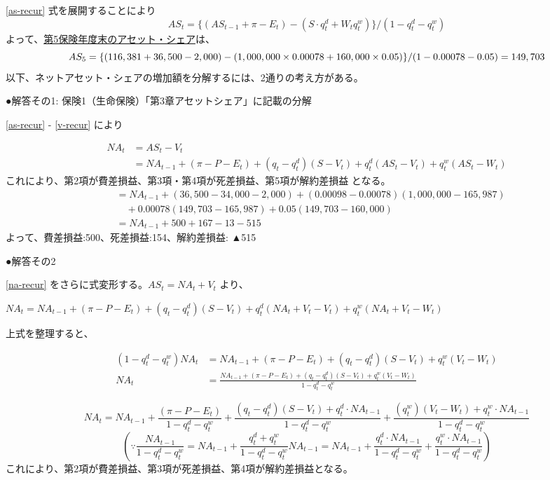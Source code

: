 \documentclass[report,gutter=10mm,fore-edge=10mm,uplatex,dvipdfmx]{jlreq}
\begin{document}
\eqref{as-recur} 式を展開することにより
$$
 AS_t=\{(AS_{t-1}+\pi-E_t)-(S\cdot q^d_t+W_tq^w_t)\}/(1-q^d_t-q^w_t)
$$
よって、\underline{第5保険年度末のアセット・シェア}は、
$$
 AS_5=\{(116,381+36,500-2,000)-(1,000,000\times 0.00078+160,000\times 0.05)\}/(1-0.00078-0.05)\\
=149,703
$$
以下、ネットアセット・シェアの増加額を分解するには、2通りの考え方がある。

●解答その1: 保険1（生命保険）「第3章アセットシェア」に記載の分解

\eqref{as-recur} - \eqref{v-recur} により

\begin{equation}
\begin{split}
NA_t&=AS_t-V_t \\
&= NA_{t-1}+(\pi-P-E_t)+(q_t-q_t^d)(S-V_t)+q_t^d(AS_t-V_t)+q_t^w(AS_t-W_t)\label{na-recur}
\end{split} 
\end{equation}
 これにより、第2項が費差損益、第3項・第4項が死差損益、第5項が解約差損益
となる。
\begin{equation*}
 \begin{split}
  &= NA_{t-1}+(36,500-34,000-2,000)+(0.00098-0.00078)(1,000,000-165,987)\\
&\quad +0.00078(149,703-165,987)+0.05(149,703-160,000)\\
&=NA_{t-1}+500+167-13-515
 \end{split}
\end{equation*}
よって、費差損益:500、死差損益:154、解約差損益: ▲515

●解答その2

\eqref{na-recur} をさらに式変形する。$AS_t=NA_t+V_t$ より、

$NA_t=NA_{t-1}+(\pi-P-E_t)+(q_t-q^d_t)(S-V_t)+q^d_t(NA_t+V_t-V_t)+q^w_t(NA_t+V_t-W_t)$

上式を整理すると、

\begin{align*}
 (1-q^d_t-q^w_t)NA_t & = NA_{t-1}+(\pi-P-E_t)+(q_t-q^d_t)(S-V_t)+q^w_t(V_t-W_t)\\
NA_t&=\frac{NA_{t-1}+(\pi-P-E_t)+(q_t-q^d_t)(S-V_t)+q^w_t(V_t-W_t)}{1-q^d_t-q^w_t}
\end{align*}

$$
NA_t=NA_{t-1}+\frac{(\pi-P-E_t)}{1-q^d_t-q^w_t}
+\frac{(q_t-q^d_t)(S-V_t)+q^d_t\cdot NA_{t-1}}{1-q^d_t-q^w_t}
+\frac{(q^w_t)(V_t-W_t)+q^w_t\cdot NA_{t-1}}{1-q^d_t-q^w_t}
$$
$$
\left(\because \frac{NA_{t-1}}{1-q^d_t-q^w_t}=NA_{t-1}+\frac{q^d_t+q^w_t}{1-q^d_t-q^w_t}NA_{t-1}
=NA_{t-1}+\frac{q^d_t\cdot NA_{t-1}}{1-q^d_t-q^w_t}+\frac{q^w_t\cdot NA_{t-1}}{1-q^d_t-q^w_t}
\right)
$$
これにより、第2項が費差損益、第3項が死差損益、第4項が解約差損益となる。
\end{document}
